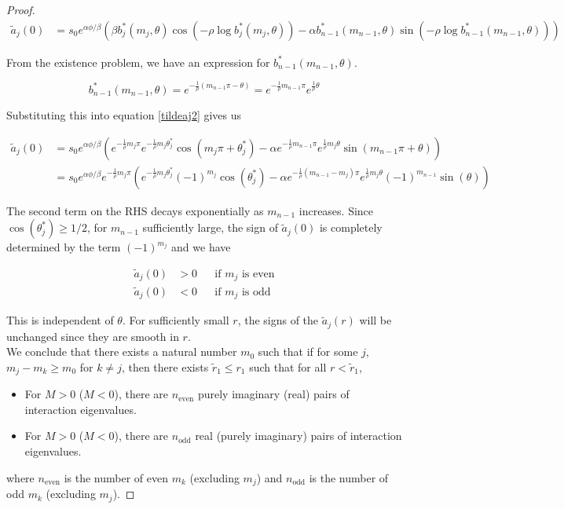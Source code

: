 \documentclass[thesis.tex]{subfiles}
\begin{document}
\begin{lemma}
\begin{proof}
\begin{align}\label{tildeaj2}
\tilde{a}_j(0) 
&= s_0 e^{\alpha \phi/\beta} \left( \beta b^*_j(m_j, \theta) \cos\left( -\rho \log b^*_j(m_j, \theta) \right) - \alpha b^*_{n-1}(m_{n-1}, \theta) \sin \left(  -\rho \log b^*_{n-1}(m_{n-1}, \theta) \right) \right) 
\end{align}

From the existence problem, we have an expression for $b^*_{n-1}(m_{n-1}, \theta)$.

\[
b^*_{n-1}(m_{n-1}, \theta) = e^{ -\frac{1}{\rho}(m_{n-1} \pi - \theta) } =
e^{ -\frac{1}{\rho}m_{n-1} \pi} e^{ \frac{1}{\rho}\theta }
\]

Substituting this into equation \eqref{tildeaj2} gives us

\begin{align*}
\tilde{a}_j(0) 
&= s_0 e^{\alpha \phi/\beta} \left( e^{ -\frac{1}{\rho} m_j \pi } e^{ -\frac{1}{\rho} m_j \theta^*_j } \cos\left( m_j \pi + \theta^*_j \right) - \alpha e^{ -\frac{1}{\rho} m_{n-1} \pi } e^{\frac{1}{\rho} m_j \theta } \sin \left( m_{n-1} \pi + \theta \right) \right) \\
&= s_0 e^{\alpha \phi/\beta} e^{ -\frac{1}{\rho} m_j \pi } \left(  e^{ -\frac{1}{\rho} m_j \theta^*_j } (-1)^{m_j} \cos(\theta^*_j) - \alpha e^{ -\frac{1}{\rho} (m_{n-1} - m_j) \pi } e^{\frac{1}{\rho} m_j \theta } (-1)^{m_{n-1}}\sin(\theta ) \right)  
\end{align*}

The second term on the RHS decays exponentially as $m_{n-1}$ increases. Since $\cos(\theta^*_j) \geq 1/2$, for $m_{n-1}$ sufficiently large, the sign of $\tilde{a}_j(0)$ is completely determined by the term $(-1)^{m_j}$ and we have

\begin{align*}
\tilde{a}_j(0) &> 0 && \text{if } m_j \text{ is even} \\
\tilde{a}_j(0) &< 0 && \text{if } m_j \text{ is odd}
\end{align*}

This is independent of $\theta$. For sufficiently small $r$, the signs of the $\tilde{a}_j(r)$ will be unchanged since they are smooth in $r$.\\

We conclude that there exists a natural number $m_0$ such that if for some $j$, $m_j - m_k \geq m_0$ for $k \neq j$, then there exists $\tilde{r}_1 \leq r_1$ such that for all $r < \tilde{r}_1$, 

\begin{itemize}
\item For $M > 0$ ($M < 0$), there are $n_{\text{even}}$ purely imaginary (real) pairs of interaction eigenvalues.
\item For $M > 0$ ($M < 0$), there are $n_{\text{odd}}$ real (purely imaginary) pairs of interaction eigenvalues.
\end{itemize}

where $n_{\text{even}}$ is the number of even $m_k$ (excluding $m_j$) and $n_{\text{odd}}$ is the number of odd $m_k$ (excluding $m_j$).

\end{proof}
\end{lemma}
\end{document}
